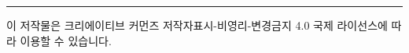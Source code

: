 \documentclass[
]{book}
\begin{document}
\begin{center}\rule{0.5\linewidth}{0.5pt}\end{center}

이 저작물은 크리에이티브 커먼즈 저작자표시-비영리-변경금지 4.0 국제 라이선스에 따라 이용할 수 있습니다.

  
\end{document}
